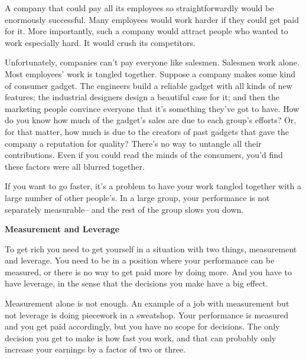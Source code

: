 A company
                    that could pay all its employees so straightforwardly would
                    be enormously successful. Many employees would work harder
                    if they could get paid for it. More importantly, such a
                    company would attract people who wanted to work especially
                    hard. It would crush its competitors.

Unfortunately,
                    companies can't pay everyone like salesmen. Salesmen work
                    alone. Most employees' work is tangled together. Suppose a
                    company makes some kind of consumer gadget. The engineers
                    build a reliable gadget with all kinds of new features; the
                    industrial designers design a beautiful case for it; and
                    then the marketing people convince everyone that it's
                    something they've got to have. How do you know how much of
                    the gadget's sales are due to each group's efforts? Or, for
                    that matter, how much is due to the creators of past gadgets
                    that gave the company a reputation for quality? There's no
                    way to untangle all their contributions. Even if you could
                    read the minds of the consumers, you'd find these factors
                    were all blurred together.

If you want to go
                    faster, it's a problem to have your work tangled together
                    with a large number of other people's. In a large group,
                    your performance is not separately measurable-- and the rest
                    of the group slows you down.

\textbf{Measurement and Leverage}

To get rich you need to get yourself in a
                    situation with two things, measurement and leverage. You
                    need to be in a position where your performance can be
                    measured, or there is no way to get paid more by doing more.
                    And you have to have leverage, in the sense that the
                    decisions you make have a big effect.

Measurement
                    alone is not enough. An example of a job with measurement
                    but not leverage is doing piecework in a sweatshop. Your
                    performance is measured and you get paid accordingly, but
                    you have no scope for decisions. The only decision you get
                    to make is how fast you work, and that can probably only
                    increase your earnings by a factor of two or three.

